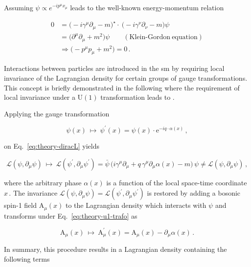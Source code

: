 Assuming $\psi\propto e^{-ip^{\mu}x_{\mu}}$ leads to the well-known energy-momentum relation

\begin{subequations}
\begin{align}
0&=\big(-i\gamma^\mu\partial_\mu-m\big)^\star\cdot ~\big(-i\gamma^\nu\partial_\nu-m\big)\psi\\
 &=\big(\partial^{\mu}\partial_{\mu}+m^{2}\big)\psi \qquad \mathrm{(Klein\mbox{-}Gordon~equation)}  \\
 &\Rightarrow \big(-p^{\mu}p_{\mu}+m^{2}\big) = 0\,.
\end{align}
\end{subequations}

Interactions between particles are introduced in the \gls{sm} by requiring local invariance of the Lagrangian density for certain groups of gauge transformations. This concept is briefly demonstrated in the following where the requirement of local invariance under a $\mathrm{U(1)}$ transformation leads to . 

Applying the gauge transformation

\begin{equation}
\psi(x)~\mapsto~\psi^{\prime}(x)=\psi(x)\cdot\mathrm{e}^{-iq\cdot\alpha(x)}\,, \label{eq:theory-u1-trafo}
\end{equation}

on Eq.~\ref{eq:theory-diracL} yields

\begin{equation}
\mathcal{L}(\psi,\partial_\mu\psi)~\mapsto~\mathcal{L}(\psi^{\prime},\partial_\mu\psi^{\prime})=\bar{\psi}\,\Big(i\gamma^\mu\partial_\mu+q\,\gamma^\mu\partial_\mu\alpha(x)-m\Big)\,\psi\not=\mathcal{L}(\psi,\partial_\mu\psi)\,,
\end{equation}

where the arbitrary phase $\alpha(x)$ is a function of the local space-time coordinate $x$\,. The invariance $\mathcal{L}(\psi,\partial_\mu\psi)=\mathcal{L}(\psi^{\prime},\partial_\mu\psi^{\prime})$ is restored by adding a bosonic spin-1 field $\mathrm{A}_{\mu}(x)$ to the Lagrangian density which interacts with $\psi$ and transforms under Eq.~\ref{eq:theory-u1-trafo} as

\begin{equation}
\mathrm{A}_{\mu}(x)~\mapsto~ \mathrm{A}^{\prime}_{\mu}(x)=\mathrm{A}_\mu(x)-\partial_\mu\alpha(x)\,.
\end{equation}

In summary, this procedure results in a Lagrangian density containing the following terms

